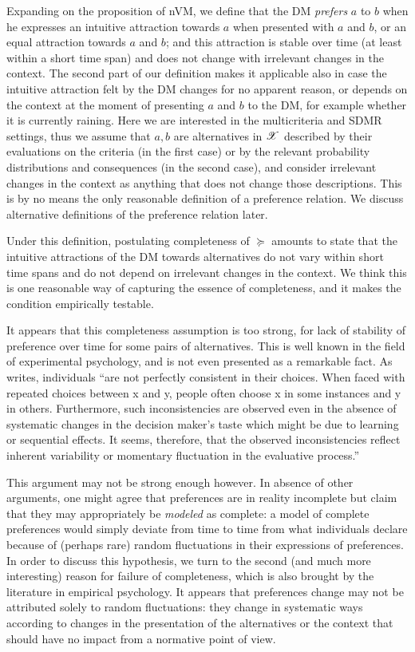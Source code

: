 \documentclass[french, english]{llncs}
\begin{document}
	Expanding on the proposition of nVM, we define that the \ac{DM} \emph{prefers} $a$ to $b$ when he expresses an intuitive attraction towards $a$ when presented with $a$ and $b$, or an equal attraction towards $a$ and $b$; and this attraction is stable over time (at least within a short time span) and does not change with irrelevant changes in the context. The second part of our definition makes it applicable also in case the intuitive attraction felt by the \ac{DM} changes for no apparent reason, or depends on the context at the moment of presenting $a$ and $b$ to the \ac{DM}, for example whether it is currently raining. Here we are interested in the multicriteria and SDMR settings, thus we assume that $a, b$ are alternatives in $\mathscr{X}$ described by their evaluations on the criteria (in the first case) or by the relevant probability distributions and consequences (in the second case), and consider irrelevant changes in the context as anything that does not change those descriptions. 
	This is by no means the only reasonable definition of a preference relation. We discuss alternative definitions of the preference relation later.
	
	Under this definition, postulating completeness of $\succeq$ amounts to state that the intuitive attractions of the \ac{DM} towards alternatives do not vary within short time spans and do not depend on irrelevant changes in the context. We think this is one reasonable way of capturing the essence of completeness, and it makes the condition empirically testable.
	
	It appears that this completeness assumption is too strong, for lack of stability of preference over time for some pairs of alternatives. This is well known in the field of experimental psychology, and is not even presented as a remarkable fact. As \citet{tversky_intransitivity_1969} writes, individuals “are not perfectly consistent in their choices. When faced with repeated choices between x and y, people often choose x in some instances and y in others. Furthermore, such inconsistencies are observed even in the absence of systematic changes in the decision maker’s taste which might be due to learning or sequential effects. It seems, therefore, that the observed inconsistencies reflect inherent variability or momentary fluctuation in the evaluative process.” 
	
	This argument may not be strong enough however. In absence of other arguments, one might agree that preferences are in reality incomplete but claim that they may appropriately be \emph{modeled} as complete: a model of complete preferences would simply deviate from time to time from what individuals declare because of (perhaps rare) random fluctuations in their expressions of preferences. 
	In order to discuss this hypothesis, we turn to the second (and much more interesting) reason for failure of completeness, which is also brought by the literature in empirical psychology. It appears that preferences change may not be attributed solely to random fluctuations: they change in systematic ways according to changes in the presentation of the alternatives or the context that should have no impact from a normative point of view.
	
\end{document}
